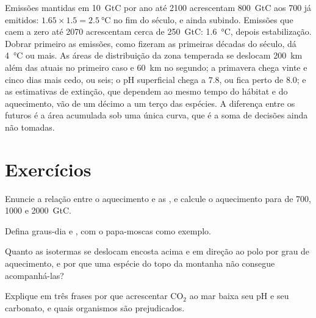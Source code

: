 \begin{example}\label{ex:b2:global-change:scenarios}
Emissões mantidas em \qty{10}{GtC} por ano até 2100 acrescentam
\qty{800}{GtC} aos \qty{700}{} já emitidos: $1.65\times 1.5 =
\qty{2.5}{\celsius}$ no fim do século, e ainda subindo. Emissões que
caem a zero até 2070 acrescentam cerca de \qty{250}{GtC}:
\qty{1.6}{\celsius}, depois estabilização. Dobrar primeiro as emissões,
como fizeram as primeiras décadas do século, dá \qty{4}{\celsius} ou
mais. As áreas de distribuição da zona temperada se deslocam
\qty{200}{km} além das atuais no primeiro caso
e \qty{60}{km} no segundo; a primavera chega vinte e
cinco dias mais cedo, ou seis; o pH superficial chega a $7.8$, ou fica
perto de $8.0$; e as estimativas de extinção, que dependem ao mesmo tempo
do hábitat e do aquecimento, vão de um décimo a um terço das espécies. A
diferença entre os futuros é a área acumulada sob uma única curva, que é
a soma de decisões ainda não tomadas.
\end{example}

\section{Exercícios}

\begin{exercise}[$\star$]\label{exo:b2:global-change:1}
Enuncie a relação entre o aquecimento e as , e
calcule o aquecimento para  de 700, 1000 e
\qty{2000}{GtC}.
\end{exercise}

\begin{exercise}[$\star$]\label{exo:b2:global-change:2}
Defina graus-dia e , com o papa-moscas como
exemplo.
\end{exercise}

\begin{exercise}[$\star$]\label{exo:b2:global-change:3}
Quanto as isotermas se deslocam encosta acima e em direção ao polo por
grau de aquecimento, e por que uma espécie do topo da montanha não
consegue acompanhá-las?
\end{exercise}

\begin{exercise}[$\star$]\label{exo:b2:global-change:4}
Explique em três frases por que acrescentar \ensuremath{\mathrm{CO_2}} ao mar
baixa seu pH e seu carbonato, e quais organismos são prejudicados.
\end{exercise}

